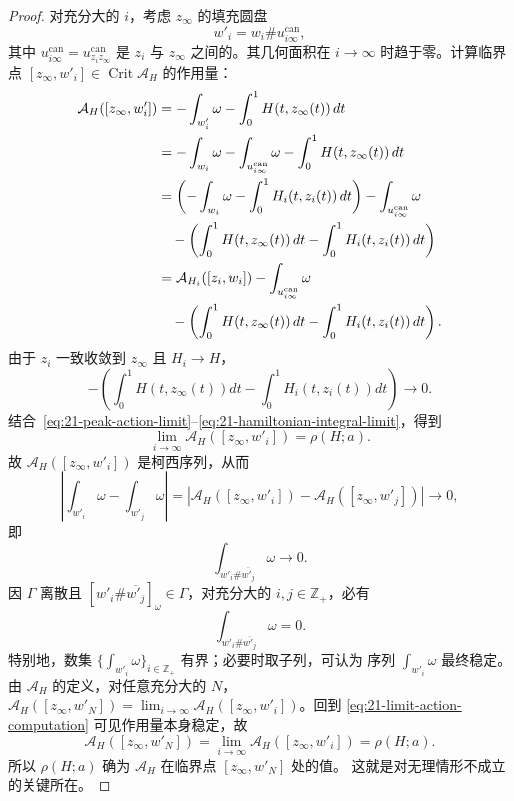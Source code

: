 \begin{proof}
对充分大的 $i$，考虑 $z_\infty$ 的填充圆盘
\[
 w'_i=w_i\#u_{i\infty}^{\mathrm{can}},
\]
其中 $u_{i\infty}^{\mathrm{can}}=u_{z_i z_\infty}^{\mathrm{can}}$ 是 $z_i$ 与
$z_\infty$ 之间的\termCanonicalThinCylinder{}。其几何面积在 $i\to\infty$ 时趋于零。计算临界点
$[z_\infty,w'_i]\in\operatorname{Crit}\mathcal A_H$ 的作用量：
\begin{align}
 \mathcal A_H([z_\infty,w'_i])
 &=-\int_{w'_i}\omega-\int_0^1H(t,z_\infty(t))\,dt \notag\\
 &=-\int_{w_i}\omega-\int_{u_{i\infty}^{\mathrm{can}}}\omega
   -\int_0^1H(t,z_\infty(t))\,dt \notag\\
 &=\left(-\int_{w_i}\omega-\int_0^1H_i(t,z_i(t))\,dt\right)
   -\int_{u_{i\infty}^{\mathrm{can}}}\omega \notag\\
 &\quad-\left(\int_0^1H(t,z_\infty(t))\,dt
   -\int_0^1H_i(t,z_i(t))\,dt\right) \notag\\
 &=\mathcal A_{H_i}([z_i,w_i])
   -\int_{u_{i\infty}^{\mathrm{can}}}\omega \notag\\
 &\quad-\left(\int_0^1H(t,z_\infty(t))\,dt
   -\int_0^1H_i(t,z_i(t))\,dt\right).
 \label{eq:21-limit-action-computation}
\end{align}
由于 $z_i$ 一致收敛到 $z_\infty$ 且 $H_i\to H$，
\begin{equation}
 -\left(\int_0^1H(t,z_\infty(t))dt
 -\int_0^1H_i(t,z_i(t))dt\right)\longrightarrow0.
 \label{eq:21-hamiltonian-integral-limit}
\end{equation}
结合~\eqref{eq:21-peak-action-limit}--\eqref{eq:21-hamiltonian-integral-limit}，得到
\[
 \lim_{i\to\infty}\mathcal A_H([z_\infty,w'_i])=\rho(H;a).
\]
故 $\mathcal A_H([z_\infty,w'_i])$ 是柯西序列，从而
\[
 \left|\int_{w'_i}\omega-\int_{w'_j}\omega\right|
 =|\mathcal A_H([z_\infty,w'_i])-\mathcal A_H([z_\infty,w'_j])|
 \longrightarrow0,
\]
即
\[
 \int_{w'_i\#\overline{w'_j}}\omega\longrightarrow0.
\]
因 $\Gamma$ 离散且 $[w'_i\#\overline{w'_j}]_\omega\in\Gamma$，对充分大的
$i,j\in\mathbb Z_+$，必有
\begin{equation}
 \int_{w'_i\#\overline{w'_j}}\omega=0.
 \label{eq:21-rational-area-stabilization}
\end{equation}
特别地，数集 $\{\int_{w'_i}\omega\}_{i\in\mathbb Z_+}$ 有界；必要时取子列，可认为
序列 $\int_{w'_i}\omega$ 最终稳定。由 $\mathcal A_H$ 的定义，对任意充分大的 $N$，
$\mathcal A_H([z_\infty,w'_N])=
\lim_{i\to\infty}\mathcal A_H([z_\infty,w'_i])$。回到
\eqref{eq:21-limit-action-computation} 可见作用量本身稳定，故
\[
 \mathcal A_H([z_\infty,w'_N])
 =\lim_{i\to\infty}\mathcal A_H([z_\infty,w'_i])=\rho(H;a).
\]
所以 $\rho(H;a)$ 确为 $\mathcal A_H$ 在临界点 $[z_\infty,w'_N]$ 处的值。
这就是对无理情形不成立的关键所在。
\end{proof}

